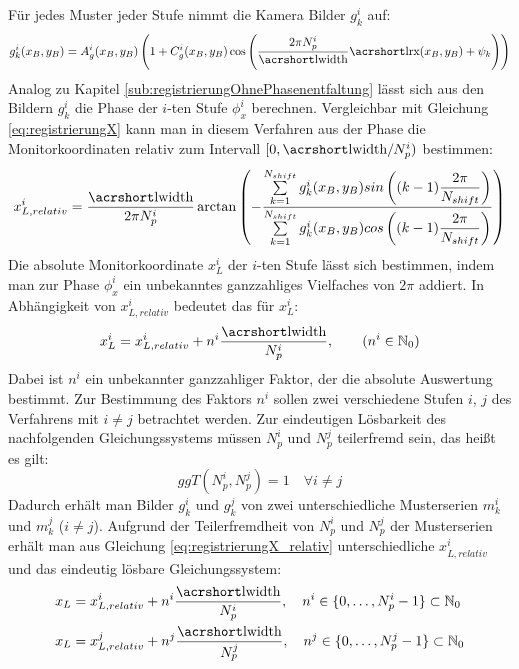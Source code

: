 \noindent
Für jedes Muster jeder Stufe nimmt die Kamera Bilder $g_k^i$ auf:
%
\begin{equation}\label{eq:kamerabild_mehrstufig}
	g_k^i(x_B, y_B) = A_g^i(x_B, y_B) \left(1 + C_g^i(x_B, y_B) \cos \left(\dfrac{2\pi N_p^i}{\acrshortmath{lwidth}}\acrshortmath{lrx}(x_B, y_B) + \psi_k\right)\right)
\end{equation}
%
Analog zu Kapitel \ref{sub:registrierungOhnePhasenentfaltung} lässt sich aus den Bildern $g_k^i$ die Phase der $i$-ten Stufe $\phi_x^i$ berechnen.
Vergleichbar mit Gleichung \ref{eq:registrierungX} kann man in diesem Verfahren aus der Phase die Monitorkoordinaten relativ zum Intervall $[0,\acrshortmath{lwidth}/N_p^i)$ bestimmen:
%
\begin{equation}\label{eq:registrierungX_relativ}
	x_{L,relativ}^i =
	\dfrac{\acrshortmath{lwidth}}{2\pi N_p^i}
	\arctan 
	\left( 
		-\dfrac
		{\sum\limits_{k=1}^{N_{shift}} g_k^i(x_B, y_B) sin\left((k - 1)\dfrac{2\pi}{N_{shift}}\right)}
		{\sum\limits_{k=1}^{N_{shift}} g_k^i(x_B, y_B) cos\left((k - 1)\dfrac{2\pi}{N_{shift}}\right)}
	\right)
\end{equation}
%
Die absolute Monitorkoordinate $x_L^i$ der $i$-ten Stufe lässt sich bestimmen, indem man zur Phase $\phi_x^i$ ein unbekanntes ganzzahliges Vielfaches von $2\pi$ addiert.
In Abhängigkeit von $x_{L,relativ}^i$ bedeutet das für $x_L^i$:
%
\begin{equation}\label{eq:registrierungX_absolut}
	x_L^i = x_{L,relativ}^i + n^i \dfrac{\acrshortmath{lwidth}}{N_p^i},
	\qquad
	(n^i \in \mathbb{N}_0)
\end{equation}
%
Dabei ist $n^i$ ein unbekannter ganzzahliger Faktor, der die absolute Auswertung bestimmt.
Zur Bestimmung des Faktors $n^i$ sollen zwei verschiedene Stufen $i$, $j$ des Verfahrens mit $i \neq j$ betrachtet werden.
Zur eindeutigen Lösbarkeit des nachfolgenden Gleichungssystems müssen $N_p^i$ und $N_p^j$ teilerfremd sein, das heißt es gilt:
%
\begin{equation*}
	ggT(N_p^i, N_p^j) = 1
	\quad
	\forall i \neq j
\end{equation*}
%
Dadurch erhält man Bilder $g_k^i$ und $g_k^j$ von zwei unterschiedliche Musterserien $m_k^i$ und $m_k^j$ ($i \neq j$).
Aufgrund der Teilerfremdheit von $N_p^i$ und $N_p^j$ der Musterserien erhält man aus Gleichung \ref{eq:registrierungX_relativ} unterschiedliche $x_{L,relativ}^i$ und das eindeutig lösbare Gleichungssystem:
%
\begin{equation}\label{eq:gleichungssystemRegistrierung}
	\begin{split}
		x_L & = x_{L,relativ}^i + n^i \dfrac{\acrshortmath{lwidth}}{N_p^i},
		\quad n^i \in \lbrace 0,\ldots, N_p^i - 1 \rbrace \subset \mathbb{N}_0\\
		x_L & = x_{L,relativ}^j + n^j \dfrac{\acrshortmath{lwidth}}{N_p^j},
		\quad n^j \in \lbrace 0,\ldots, N_p^j - 1 \rbrace \subset \mathbb{N}_0
	\end{split}
\end{equation}
